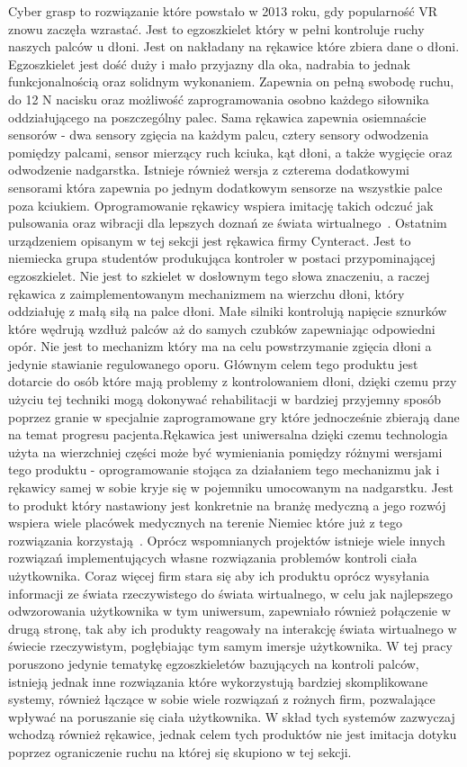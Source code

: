 	 Cyber grasp to rozwiązanie które powstało w 2013 roku, gdy popularność VR znowu zaczęła wzrastać. Jest to egzoszkielet który w pełni kontroluje ruchy naszych palców u dłoni. Jest on nakładany na rękawice które zbiera dane o dłoni. Egzoszkielet jest dość duży i mało przyjazny dla oka, nadrabia to jednak funkcjonalnością oraz solidnym wykonaniem. Zapewnia on pełną swobodę ruchu, do 12 N nacisku oraz możliwość zaprogramowania osobno każdego siłownika oddziałującego na poszczególny palec. Sama rękawica zapewnia osiemnaście sensorów - dwa sensory zgięcia na każdym palcu, cztery sensory odwodzenia pomiędzy palcami, sensor mierzący ruch kciuka, kąt dłoni, a także wygięcie oraz odwodzenie nadgarstka. Istnieje również wersja z czterema dodatkowymi sensorami która zapewnia po jednym dodatkowym sensorze na wszystkie palce poza kciukiem. Oprogramowanie rękawicy wspiera imitację takich odczuć jak pulsowania oraz wibracji dla lepszych doznań ze świata wirtualnego~\cite{cyber}. Ostatnim urządzeniem opisanym w tej sekcji jest rękawica firmy Cynteract. Jest to niemiecka grupa studentów produkująca kontroler w postaci przypominającej egzoszkielet. Nie jest to szkielet w dosłownym tego słowa znaczeniu, a raczej rękawica z zaimplementowanym mechanizmem na wierzchu dłoni, który oddziałuję z małą siłą na palce dłoni. Małe silniki kontrolują napięcie sznurków które wędrują wzdłuż palców aż do samych czubków zapewniając odpowiedni opór. Nie jest to mechanizm który ma na celu powstrzymanie zgięcia dłoni a jedynie stawianie regulowanego oporu. Głównym celem tego produktu jest dotarcie do osób które mają problemy z kontrolowaniem dłoni, dzięki czemu przy użyciu tej techniki mogą dokonywać rehabilitacji w bardziej przyjemny sposób poprzez granie w specjalnie zaprogramowane gry które jednocześnie zbierają dane na temat progresu pacjenta.Rękawica jest uniwersalna dzięki czemu technologia użyta na wierzchniej części może być wymieniania pomiędzy różnymi wersjami tego produktu - oprogramowanie stojąca za działaniem tego mechanizmu jak i rękawicy samej w sobie kryje się w pojemniku umocowanym na nadgarstku. Jest to produkt który nastawiony jest konkretnie na branżę medyczną a jego rozwój wspiera wiele placówek medycznych na terenie Niemiec które już z tego rozwiązania korzystają~\cite{act}. Oprócz wspomnianych projektów istnieje wiele innych rozwiązań implementujących własne rozwiązania problemów kontroli ciała użytkownika. Coraz więcej firm stara się aby ich produktu oprócz wysyłania informacji ze świata rzeczywistego do świata wirtualnego, w celu jak najlepszego odwzorowania użytkownika w tym uniwersum, zapewniało również połączenie w drugą stronę, tak aby ich produkty reagowały na interakcję świata wirtualnego w świecie rzeczywistym, pogłębiając tym samym imersje użytkownika. W tej pracy poruszono jedynie tematykę egzoszkieletów bazujących na kontroli palców, istnieją jednak inne rozwiązania które wykorzystują bardziej skomplikowane systemy, również łączące w sobie wiele rozwiązań z rożnych firm, pozwalające wpływać na poruszanie się ciała użytkownika. W skład tych systemów zazwyczaj wchodzą również rękawice, jednak celem tych produktów nie jest imitacja dotyku poprzez ograniczenie ruchu na której się skupiono w tej sekcji. 